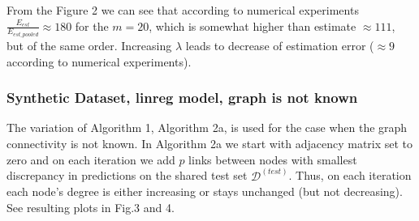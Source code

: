 \documentclass{article}
\begin{document}
From the Figure 2 we can see that according to numerical experiments $\frac{E_{est}}{E_{est\_pooled}} \approx 180$ for the $m=20$, which is somewhat higher than estimate $\approx 111$, but of the same order. Increasing $\lambda$ leads to decrease of estimation error ($\approx 9$ according to numerical experiments).


\newpage
\subsubsection{Synthetic Dataset, linreg model, graph is not known}

The variation of Algorithm 1, Algorithm 2a, is used for the case when the graph connectivity is not known. In Algorithm 2a we start with adjacency matrix set to zero and on each iteration we add $p$ links between nodes with smallest discrepancy in predictions on the shared test set $\mathcal{D}^{(test)}$. Thus, on each iteration each node's degree is either increasing or stays unchanged (but not decreasing). See resulting plots in Fig.3 and 4.
\end{document}
